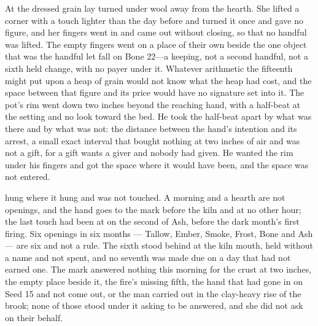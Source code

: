 At  the dressed grain lay turned under wool away from the hearth. She lifted a corner with a touch lighter than the day before and turned it once and gave no figure, and her fingers went in and came out without closing, so that no handful was lifted. The empty fingers went on a place of their own beside the one object that was the handful let fall on Bone 22---a keeping, not a second handful, not a sixth held change, with no payer under it. Whatever arithmetic the fifteenth might put upon a heap of grain would not know what the heap had cost, and the space between that figure and its price would have no signature set into it. The pot's rim went down two inches beyond the reaching hand, with a half-beat at the setting and no look toward the bed. He took the half-beat apart by what was there and by what was not: the distance between the hand's intention and its arrest, a small exact interval that bought nothing at two inches of air and was not a gift, for a gift wants a giver and nobody had given. He wanted the rim under his fingers and got the space where it would have been, and the space was not entered.

\scenebreak

 hung where it hung and was not touched. A morning and a hearth are not openings, and the hand goes to the mark before the kiln and at no other hour; the last touch had been at  on the second of Ash, before the dark month's first firing. Six openings in six months --- Tallow, Ember, Smoke, Frost, Bone and Ash --- are six and not a rule. The sixth stood behind at the kiln mouth, held without a name and not spent, and no seventh was made due on a day that had not earned one. The mark answered nothing this morning for the crust at two inches, the empty place beside it, the fire's missing fifth, the hand that had gone in on Seed 15 and not come out, or the man carried out in the clay-heavy rise of the brook; none of those stood under it asking to be answered, and she did not ask on their behalf.

